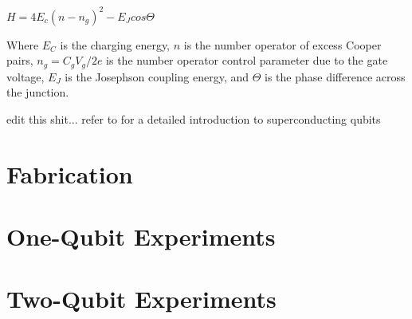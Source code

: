 \documentclass[12pt,letterpaper,notitlepage]{report}
\begin{document}
$H=4E_c(n-n_g)^2-E_Jcos\Theta$

Where $E_C$ is the charging energy, $n$ is the number operator of excess Cooper pairs, $n_g=C_gV_g/2e$ is the number operator control parameter due to the gate voltage, $E_J$ is the Josephson coupling energy, and $\Theta$ is the phase difference across the junction.

edit this shit... refer to \cite{reviewPaper} for a detailed introduction to superconducting qubits

%
%

\section*{Fabrication}

%
%

\section*{One-Qubit Experiments}



%
%

\section*{Two-Qubit Experiments}



\end{document}

